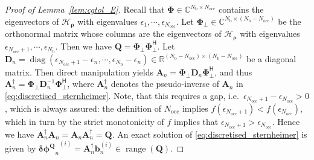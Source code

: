 \documentclass[hidelinks,onefignum,onetabnum]{siamart250211}
\newcommand{\R}{\mathbb{R}}
\newcommand{\C}{\mathbb{C}}
\newcommand{\range}{\operatorname{range}}
\newcommand{\diag}{\operatorname{diag}}
\newcommand{\Nocc}{N_{\mathrm{occ}}}
\newcommand{\Nb}{N_{\mathrm{b}}}
\newcommand{\HrhoB}{\bm{\mathcal{H}}_{\bm \rho}}
\begin{document}
\begin{proof}[Proof of Lemma~\ref{lem:cgtol_E}]
    Recall that $\bm \Phi \in \C^{\Nb \times \Nocc}$ contains the eigenvectors of $\HrhoB$ with eigenvalues $\epsilon_1, \cdots, \epsilon_{\Nocc}$. Let $\bm \Phi_{\perp} \in \C^{\Nb \times (\Nb - \Nocc)}$ be the orthonormal matrix whose columns are the eigenvectors of $\HrhoB$ with eigenvalues $\epsilon_{\Nocc + 1}, \cdots, \epsilon_{\Nb}$.
    Then we have $\bm Q = \bm \Phi_{\perp} \bm \Phi_{\perp}^\mathsf{H}$. Let $\bm D_n = \diag(\epsilon_{\Nocc + 1} - \epsilon_n, \cdots, \epsilon_{\Nb} - \epsilon_n) \in \R^{(\Nb - \Nocc) \times (\Nb - \Nocc)}$ be a diagonal matrix. Then direct manipulation yields $\bm A_n = \bm \Phi_{\perp} \bm D_n \bm \Phi_{\perp}^\mathsf{H}$, and thus $\bm A_n^{\dagger} = \bm \Phi_{\perp} \bm D_n^{-1} \bm \Phi_{\perp}^\mathsf{H}$, where $\bm A_n^{\dagger}$ denotes the pseudo-inverse of $\bm A_n$ in \eqref{eq:discretised_sternheimer}. 
    Note, that this requires a gap, i.e.~$\epsilon_{\Nocc + 1} - \epsilon_{\Nocc} > 0$,
    which is always assured: the definition of $\Nocc$ implies
    $f(\epsilon_{\Nocc + 1}) < f(\epsilon_{\Nocc})$,
    which in turn by the strict monotonicity of $f$
    implies that $\epsilon_{\Nocc + 1}> \epsilon_{\Nocc}$.
    Hence we have $\bm A_n^{\dagger} \bm A_n = \bm A_n \bm A_n^{\dagger} = \bm Q$. An exact solution of \eqref{eq:discretised_sternheimer} is given by ${\bm{\delta \phi^Q}_n}^{(i)} = \bm A_n^{\dagger} \bm b_n^{(i)} \in \range(\bm Q)$. 


\end{proof}
\end{document}
